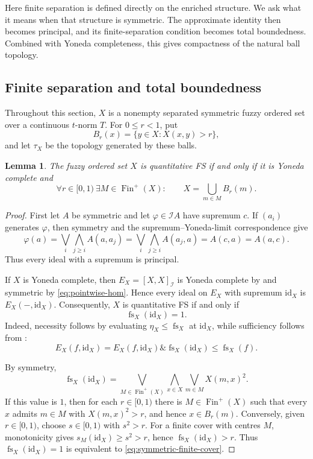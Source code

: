\documentclass[preprint,3p,times]{elsarticle}
\newtheorem{lemma}[lemma]{Lemma}
\theoremstyle{definition}
\theoremstyle{remark}
\newcommand{\I}{\mathcal{I}}
\newcommand{\id}{\mathrm{id}}
\newcommand{\fs}{\operatorname{fs}}
\newcommand{\Finp}{\operatorname{Fin}^{+}}
\newcommand{\tn}{\mathbin{\&}}
\numberwithin{equation}{section}
\begin{document}
Here finite separation is defined directly on the enriched structure. We ask what it means when that structure is symmetric. The approximate identity then becomes principal, and its finite-separation condition becomes total boundedness. Combined with Yoneda completeness, this gives compactness of the natural ball topology.

\subsection{Finite separation and total boundedness}
Throughout this section, \(X\) is a nonempty separated symmetric fuzzy ordered set over a continuous \(t\)-norm \(T\). For \(0\leq r<1\), put
\begin{equation}\label{eq:symmetric-open-balls}
 B_r(x)=\{y\in X:X(x,y)>r\},
\end{equation}
and let \(\tau_X\) be the topology generated by these balls.

\begin{lemma}\label{lem:symmetric-fs-cover}
The fuzzy ordered set \(X\) is quantitative FS if and only if it is Yoneda complete and
\begin{equation}\label{eq:symmetric-finite-cover}
 \forall r\in[0,1)\ \exists M\in\Finp(X):
 \qquad X=\bigcup_{m\in M}B_r(m).
\end{equation}
\end{lemma}

\begin{proof}
First let \(A\) be symmetric and let \(\varphi\in\I A\) have supremum \(c\). If \((a_i)\) generates \(\varphi\), then symmetry and the supremum--Yoneda-limit correspondence give
\[
 \varphi(a)
 =\bigvee_i\bigwedge_{j\geq i}A(a,a_j)
 =\bigvee_i\bigwedge_{j\geq i}A(a_j,a)
 =A(c,a)=A(a,c).
\]
Thus every ideal with a supremum is principal.

If \(X\) is Yoneda complete, then \(E_X=[X,X]_{\I}\) is Yoneda complete by  and symmetric by \eqref{eq:pointwise-hom}. Hence every ideal on \(E_X\) with supremum \(\id_X\) is \(E_X(-,\id_X)\). Consequently, \(X\) is quantitative FS if and only if
\[
 \fs_X(\id_X)=1.
\]
Indeed, necessity follows by evaluating \(\eta_X\leq\fs_X\) at \(\id_X\), while sufficiency follows from :
\[
 E_X(f,\id_X)
 =E_X(f,\id_X)\tn\fs_X(\id_X)
 \leq\fs_X(f).
\]

By symmetry,
\[
 \fs_X(\id_X)
 =\bigvee_{M\in\Finp(X)}\bigwedge_{x\in X}
 \bigvee_{m\in M}X(m,x)^2.
\]
If this value is \(1\), then for each \(r\in[0,1)\) there is \(M\in\Finp(X)\) such that every \(x\) admits \(m\in M\) with \(X(m,x)^2>r\), and hence \(x\in B_r(m)\). Conversely, given \(r\in[0,1)\), choose \(s\in[0,1)\) with \(s^2>r\). For a finite cover with centres \(M\), monotonicity gives \(s_M(\id_X)\geq s^2>r\), hence \(\fs_X(\id_X)>r\). Thus \(\fs_X(\id_X)=1\) is equivalent to \eqref{eq:symmetric-finite-cover}.
\end{proof}
\end{document}
